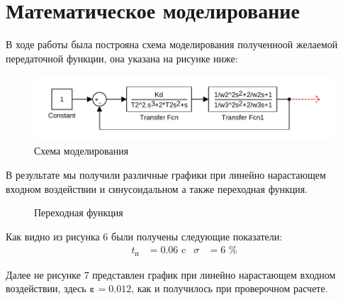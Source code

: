 \documentclass[a4paper, 12pt]{article}
\begin{document}
\section{Математическое моделирование}

В ходе работы была построяна схема моделирования полученноой желаемой передаточной функции, она указана на рисунке ниже: 
\begin{figure}[h!]
    \centering
    \includegraphics {images/model.pdf} 
    \caption{Схема моделирования}
\end{figure} \par

В результате мы получили различные графики при линейно нарастающем входном воздействии и синусоидальном а также переходная функция.
\begin{figure}[h!]
    \centering
    \caption{Переходная функция}
\end{figure} \par
Как видно из рисунка 6 были получены следующие показатели:
\begin{align*}
    t_\text{п} & = 0.06\text{ c} & \sigma & = 6\text{ \%}
\end{align*} \par

\newpage
Далее не рисунке 7 представлен график при линейно нарастающем входном воздействии, здесь $\pmb{\varepsilon} = 0.012$, как и получилось при проверочном расчете.
\end{document}
